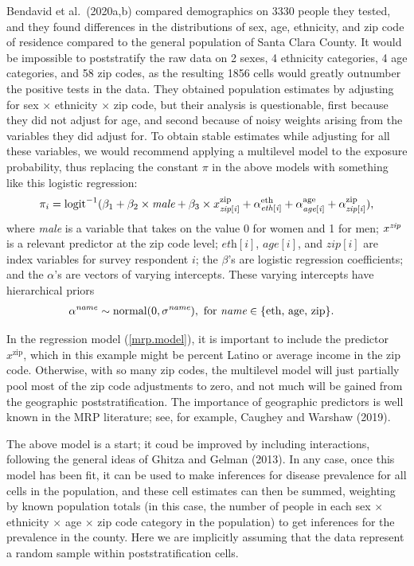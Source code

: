 \documentclass[11pt]{article}
\begin{document}
Bendavid et al.\ (2020a,b) compared demographics on 3330 people they tested, and they found differences in the distributions of sex, age, ethnicity, and zip code of residence compared to the general population of Santa Clara County. It would be impossible to poststratify the raw data on 2 sexes, 4 ethnicity categories,  4 age categories, and 58 zip codes, as the resulting 1856 cells would greatly outnumber the positive tests in the data.  They obtained population estimates by adjusting for sex $\times$ ethnicity $\times$ zip code, but their analysis is questionable, first because they did not adjust for age, and second because of noisy weights arising from the variables they did adjust for.
To obtain stable estimates while adjusting for all these variables, we would recommend applying a multilevel model to the exposure probability, thus replacing the constant $\pi$ in the above models with something like this logistic regression:
\begin{equation}\label{mrp.model}
\pi_i = \mbox{logit}^{-1}(\beta_1 + \beta_2 \times \mbox{\it male} + \beta_3 \times x^{\textrm{zip}}_{\it zip[i]} + \alpha^{\textrm{eth}}_{\it eth[i]} + \alpha^{\textrm{age}}_{\it age[i]} + \alpha^{\textrm{zip}}_{\it zip[i]}),
\end{equation}
where {\it male} is a variable that takes on the value 0 for women and 1 for men; $x^{\it zip}$ is a relevant predictor at the zip code level; $\textit{eth}[i]$, $\textit{age}[i]$, and $\textit{zip}[i]$ are index variables for survey respondent $i$; the $\beta$'s are logistic regression coefficients; and the $\alpha$'s are vectors of varying intercepts.  These varying intercepts have hierarchical priors
\begin{align*}
  \alpha^{\it name} &\sim \mbox{normal}(0, \sigma^{\textit{name}}), \ \textrm{for} \ \textit{name} \in \{ \textrm{eth, age, zip} \}.
\end{align*}

In the regression model (\ref{mrp.model}), it is important to include the predictor $x^{\textrm{zip}}$, which in this example might be percent Latino or average income in the zip code.  Otherwise, with so many zip codes, the multilevel model will just partially pool most of the zip code adjustments to zero, and not much will be gained from the geographic poststratification.  The importance of geographic predictors is well known in the MRP literature; see, for example, Caughey and Warshaw (2019).

The above model is a start; it coud be improved by including interactions, following the general ideas of Ghitza and Gelman (2013).  In any case, once this model has been fit, it can be used to make inferences for disease prevalence for all cells in the population, and these cell estimates can then be summed, weighting by known population totals (in this case, the number of people in each sex $\times$ ethnicity $\times$ age $\times$ zip code category in the population) to get inferences for the prevalence in the county.  Here we are implicitly assuming that the data represent a random sample within poststratification cells.
\end{document}

